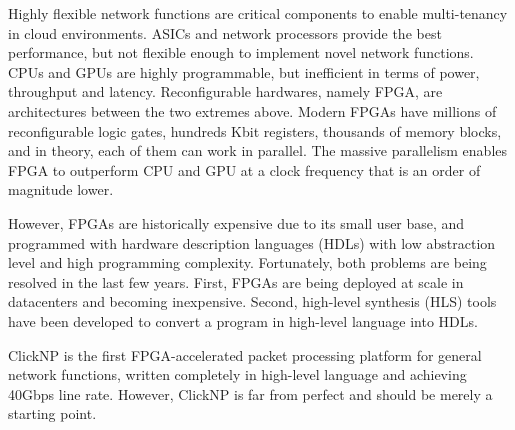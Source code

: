 \documentclass[10pt,a4paper]{article}
\begin{document}
\spacedhrule{0.8em}{-0.8em}  %



\spacedhrule{1.0em}{-0.8em}  %


Highly flexible network functions are critical components to enable multi-tenancy in cloud environments.
ASICs and network processors provide the best performance, but not flexible enough to implement novel network functions.
CPUs and GPUs are highly programmable, but inefficient in terms of power, throughput and latency.
Reconfigurable hardwares, namely FPGA, are architectures between the two extremes above.
Modern FPGAs have millions of reconfigurable logic gates, hundreds Kbit registers, thousands of memory blocks, and in theory, each of them can work in parallel.
The massive parallelism enables FPGA to outperform CPU and GPU at a clock frequency that is an order of magnitude lower.

However, FPGAs are historically expensive due to its small user base, and programmed with hardware description languages (HDLs) with low abstraction level and high programming complexity.
Fortunately, both problems are being resolved in the last few years.
First, FPGAs are being deployed at scale in datacenters and becoming inexpensive.
Second, high-level synthesis (HLS) tools have been developed to convert a program in high-level language into HDLs.

ClickNP is the first FPGA-accelerated packet processing platform for general network functions, written completely in high-level language and achieving 40Gbps line rate.
However, ClickNP is far from perfect and should be merely a starting point.
\end{document}
